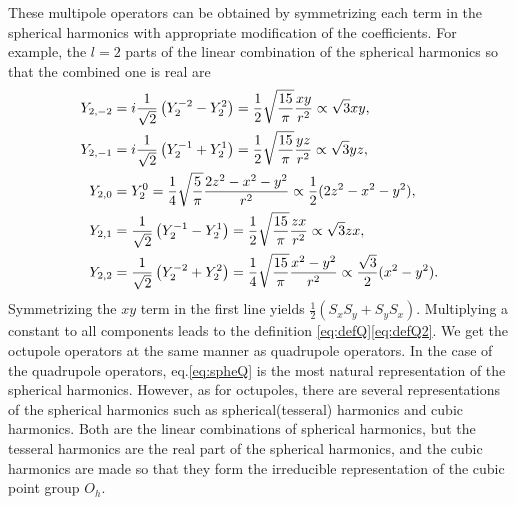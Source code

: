 \documentclass[11pt, aps, longbibliography]{article}
\begin{document}
        These multipole operators can be obtained by symmetrizing each term in the spherical harmonics with appropriate modification of the coefficients.
        For example, the $l=2$ parts of the linear combination of the spherical harmonics so that the combined one is real are
        \begin{align}\label{eq:spheQ}
            Y_{2,-2} &= i\frac{1}{\sqrt{2}}\left( Y_2^{-2} - Y_2^2 \right) = \frac{1}{2}\sqrt{\frac{15}{\pi}}\frac{xy}{r^2} \propto \sqrt{3}xy, \notag \\
            Y_{2,-1} &= i\frac{1}{\sqrt{2}}\left( Y_2^{-1} + Y_2^1 \right) = \frac{1}{2}\sqrt{\frac{15}{\pi}}\frac{yz}{r^2} \propto \sqrt{3}yz, \notag \\
            Y_{2,0} &= Y_2^0 = \frac{1}{4}\sqrt{\frac{5}{\pi}}\frac{2z^2-x^2-y^2}{r^2} \propto \frac{1}{2}(2z^2-x^2-y^2), \\
            Y_{2,1} &= \frac{1}{\sqrt{2}}\left( Y_2^{-1} - Y_2^1 \right) = \frac{1}{2}\sqrt{\frac{15}{\pi}}\frac{zx}{r^2} \propto \sqrt{3}zx, \notag \\
            Y_{2,2} &= \frac{1}{\sqrt{2}}\left( Y_2^{-2} + Y_2^2 \right) = \frac{1}{4}\sqrt{\frac{15}{\pi}}\frac{x^2-y^2}{r^2} \propto \frac{\sqrt{3}}{2}(x^2-y^2). \notag 
        \end{align}
        Symmetrizing the $xy$ term in the first line yields $\frac{1}{2}(S_xS_y+S_yS_x)$. Multiplying a constant to all components leads to the definition \eqref{eq:defQ}\eqref{eq:defQ2}.
        We get the octupole operators at the same manner as quadrupole operators. In the case of the quadrupole operators, eq.\eqref{eq:spheQ} is the most natural representation of the spherical harmonics. 
        However, as for octupoles, there are several representations of the spherical harmonics such as spherical(tesseral) harmonics and cubic harmonics.
        Both are the linear combinations of spherical harmonics, but the 
        tesseral harmonics are the real part of the spherical harmonics, and the cubic harmonics are made so that they form the irreducible representation of the cubic point group $O_h$.
        
\end{document}
